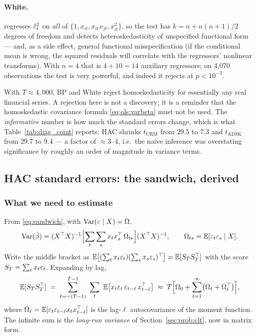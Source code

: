 \paragraph{White.} \cite{white1980} regresses $\hat{\varepsilon}_t^2$ on \emph{all} of
$\{1, x_{it}, x_{it}x_{jt}, x_{it}^2\}$, so the test has $k=n+n(n+1)/2$ degrees of
freedom and detects heteroskedasticity of unspecified functional form --- and, as a side
effect, general functional misspecification (if the conditional mean is wrong, the squared
residuals will correlate with the regressors' nonlinear transforms). With $n=4$ that is
$4+10=14$ auxiliary regressors; on 4{,}070 observations the test is very powerful, and
indeed it rejects at $p<10^{-3}$.

\begin{remark}
With $T\approx4{,}000$, BP and White reject homoskedasticity for essentially any real
financial series. A rejection here is not a discovery; it is a reminder that the
homoskedastic covariance formula \eqref{eq:ols:varbeta} must not be used. The
\emph{informative} number is how much the standard errors change, which is what
Table~\ref{tab:diag_coint} reports: HAC shrinks $t_{\text{CRM}}$ from $29.5$ to $7.3$
and $t_{\text{ADSK}}$ from $29.7$ to $9.4$ --- a factor of $\approx3$--$4$, i.e.\ the
naive inference was overstating significance by roughly an order of magnitude in
variance terms.
\end{remark}

\subsection{HAC standard errors: the sandwich, derived}
\label{sec:ts:hac}

\subsubsection{What we need to estimate}

From \eqref{eq:sandwich}, with $\operatorname{Var}(\varepsilon\mid X)=\Omega$,
\[
  \operatorname{Var}(\hat\beta) = (X^{\top}X)^{-1}\Bigl[\sum_{t}\sum_{s}x_tx_s^{\top}\,\Omega_{ts}\Bigr](X^{\top}X)^{-1},
  \qquad \Omega_{ts}=\mathbb{E}[\varepsilon_t\varepsilon_s\mid X].
\]
Write the middle bracket as $\mathbb{E}\bigl[(\sum_t x_t\varepsilon_t)(\sum_s x_s\varepsilon_s)^{\top}\bigr]
= \mathbb{E}[S_TS_T^{\top}]$ with the score $S_T=\sum_t x_t\varepsilon_t$. Expanding by lag,
\begin{equation}
  \E[S_TS_T^{\top}] \;=\; \sum_{\ell=-(T-1)}^{T-1}\ \sum_{t}\ \E\bigl[x_t\eps_t\,\eps_{t-\ell}\,x_{t-\ell}^{\top}\bigr]
  \;\approx\; T\Bigl[\Omega_0 + \sum_{\ell=1}^{\infty}\bigl(\Omega_\ell+\Omega_\ell^{\top}\bigr)\Bigr],
  \label{eq:lrvarmatrix}
\end{equation}
where $\Omega_\ell = \mathbb{E}[\varepsilon_t\varepsilon_{t-\ell}x_tx_{t-\ell}^{\top}]$ is the lag-$\ell$
autocovariance of the moment function. The infinite sum is the \emph{long-run variance}
of Section~\ref{sec:prob:clt}, now in matrix form.


